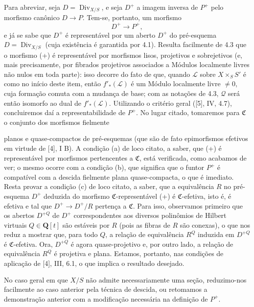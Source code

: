 \documentclass[11pt,twoside,openany]{book}
\numberwithin{equation}{section}
\newcommand{\src}[1]{%
  \phantomsection\hypertarget{src:#1}{}%
  \marginpar{\raggedleft\footnotesize\sffamily #1}%
}
\theoremstyle{plain}
\theoremstyle{definition}
\theoremstyle{remark}
\newcommand{\FgaUnitKey}{frontmatter}
\renewcommand{\src}[1]{%
  \phantomsection\hypertarget{src:\FgaUnitKey:#1}{}%
  \marginpar{\raggedleft\footnotesize\sffamily #1}%
}
\begin{document}
Para abreviar, seja $D=\operatorname{Div}_{X/S}$, e seja $D^+$ a imagem inversa
de $P^+$ pelo morfismo canônico $D\longrightarrow P$. Tem-se, portanto, um
morfismo
\begin{equation}
D^+\longrightarrow P^+,
\tag{+}
\end{equation}
e já se sabe que $D^+$ é representável por um aberto $D^+$ do pré-esquema
$D=\operatorname{Div}_{X/S}$ (cuja existência é garantida por 4.1). Resulta
facilmente de 4.3 que o morfismo (+) é representável por morfismos lisos,
projetivos e sobrejetivos (e, mais precisamente, por fibrados projetivos
associados a Módulos localmente livres não nulos em toda parte): isso decorre
do fato de que, quando $\mathcal L$ sobre $X\times_SS'$ é como no início deste
item, então $f'_*(\mathcal L)$ é um Módulo localmente livre $\neq0$, cuja
formação comuta com a mudança de base; com as notações de 4.3, $\mathcal Q$
será então isomorfo ao dual de $f'_*(\mathcal L)$. Utilizando o critério geral
([5], IV, 4.7), concluiremos daí a representabilidade de $P^+$. No lugar citado,
tomaremos para $\mathfrak C$ o conjunto dos morfismos fielmente
\src{155}
planos e quase-compactos de pré-esquemas (que são de fato epimorfismos
efetivos em virtude de [4], I B). A condição (a) de loco citato, a saber, que
(+) é representável por morfismos pertencentes a $\mathfrak C$, está verificada,
como acabamos de ver; o mesmo ocorre com a condição (b), que significa que o
funtor $P^+$ é compatível com a descida fielmente plana quase-compacta, o que
é imediato. Resta provar a condição (c) de loco citato, a saber, que a
equivalência $R$ no pré-esquema $D^+$ deduzida do morfismo
$\mathfrak C$-representável (+) é $\mathfrak C$-efetiva, isto é, é efetiva e
tal que $D^+\longrightarrow D^+/R$ pertença a $\mathfrak C$. Para isso,
observamos primeiro que os abertos $D^{+Q}$ de $D^+$ correspondentes aos
diversos polinômios de Hilbert virtuais $Q\in\mathbf Q[t]$ são estáveis por $R$
(pois as fibras de $R$ são conexas), o que nos reduz a mostrar que, para todo
$Q$, a relação de equivalência $R^Q$ induzida em $D^{+Q}$ é
$\mathfrak C$-efetiva. Ora, $D^{+Q}$ é agora quase-projetivo e, por outro lado,
a relação de equivalência $R^Q$ é projetiva e plana. Estamos, portanto, nas
condições de aplicação de [4], III, 6.1, o que implica o resultado desejado.

No caso geral em que $X/S$ não admite necessariamente uma seção, reduzimo-nos
facilmente ao caso anterior pela técnica de descida, ou retomamos a demonstração
anterior com a modificação necessária na definição de $P^+$.
\end{document}
